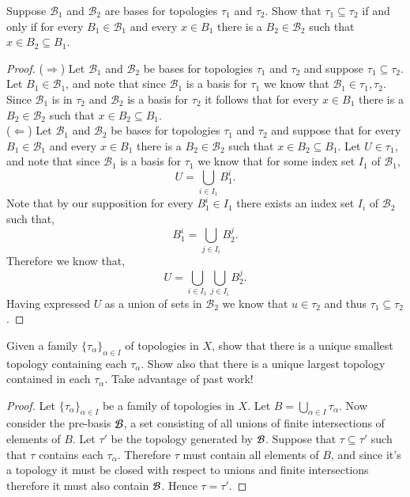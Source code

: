 \documentclass[minion]{homework651}
\def\calB{\mathcal{B}}
\begin{document}
\begin{problems}

\problem  Suppose $\calB_1$ and $\calB_2$ are bases for topologies $\tau_1$
and $\tau_2$.  Show that $\tau_1\subseteq \tau_2$ if and only if
for every $B_1\in \calB_1$ and every $x\in B_1$ there is a $B_2\in \calB_2$
such that $x\in B_2\subseteq B_1$.

\begin{proof}($\Rightarrow$) Let $\calB_1$ and $\calB_2$ be bases for topologies $\tau_1$
    and $\tau_2$ and suppose $\tau_1\subseteq \tau_2$. Let $B_1 \in \calB_1$, and note that since 
    $\calB_1$ is a basis for $\tau_1$ we know that $\calB_1 \in \tau_1, \tau_2$. Since $\calB_1$ is 
    in $\tau_2$ and $\calB_2$ is a basis for $\tau_2$ it follows that for every $x\in B_1$ there is a $B_2\in \calB_2$
    such that $x\in B_2\subseteq B_1$. \\


    ($\Leftarrow$) Let $\calB_1$ and $\calB_2$ be bases for topologies $\tau_1$
    and $\tau_2$ and suppose that for every $B_1\in \calB_1$ and every $x\in B_1$ there is a $B_2\in \calB_2$
    such that $x\in B_2\subseteq B_1$. Let $U \in \tau_1$, and note that since $\calB_1$ is a basis for $\tau_1$ 
    we know that for some index set $I_1$ of $\calB_1$,
    \begin{equation*}
        U = \bigcup_{i \in I_1} B^i_1.
    \end{equation*}
    Note that by our supposition for every $B^i_1 \in I_1$ there exists an index set $I_i$ of  $\calB_2$ such that,
    \begin{equation*}
        B^i_1 = \bigcup_{j \in I_i} B^j_2.
    \end{equation*}
    Therefore we know that, 
    \begin{equation*}
        U = \bigcup_{i \in I_1} \bigcup_{j \in I_i} B^j_2.
    \end{equation*}
    Having expressed $U$ as a union of sets in $\calB_2$ we know that $u \in \tau_2$ and thus $\tau_1\subseteq \tau_2$.
\end{proof}


\problem Given a family $\{\tau_\alpha\}_{\alpha\in I}$ of topologies in $X$,
show that there is a unique smallest topology containing each $\tau_\alpha$.
Show also that there is a unique largest topology contained in each $\tau_\alpha$.
Take advantage of past work!
\begin{proof} Let $\{\tau_\alpha\}_{\alpha\in I}$ be a family of topologies in $X$.
    Let $B = \bigcup_{\alpha \in I} \tau_\alpha$. Now consider the pre-basis $\cal{B}$, a set consisting of all unions of finite intersections of elements of $B$. Let $\tau'$ be the topology generated by $\cal{B}$.
    Suppose that $\tau \subseteq \tau'$ such that $\tau$ contains each $\tau_\alpha$. Therefore $\tau$ must contain all elements of $B$, and since it's a topology it must be closed with respect to unions and finite intersections therefore it must also contain $\cal{B}$. Hence $\tau=\tau'$.


\end{proof}
\end{problems}
\end{document}
